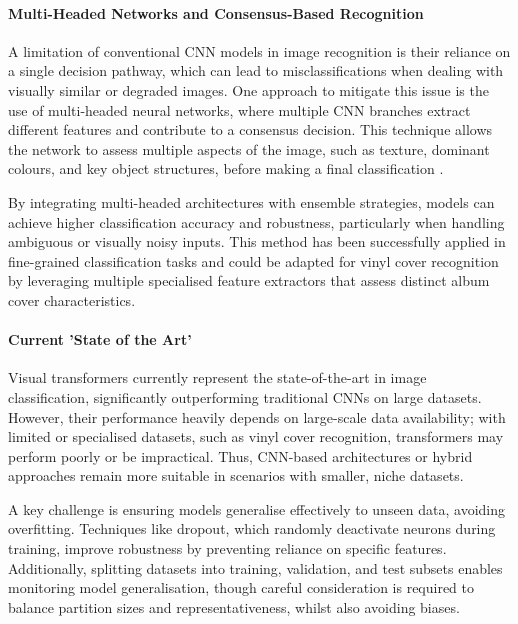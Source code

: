             \paragraph{Multi-Headed Networks and Consensus-Based Recognition}
    
                A limitation of conventional CNN models in image recognition is their reliance on a single decision pathway, which can lead to misclassifications when dealing with visually similar or degraded images. One approach to mitigate this issue is the use of multi-headed neural networks, where multiple CNN branches extract different features and contribute to a consensus decision. This technique allows the network to assess multiple aspects of the image, such as texture, dominant colours, and key object structures, before making a final classification \cite{Zheng2017}. 
            
                By integrating multi-headed architectures with ensemble strategies, models can achieve higher classification accuracy and robustness, particularly when handling ambiguous or visually noisy inputs. This method has been successfully applied in fine-grained classification tasks and could be adapted for vinyl cover recognition by leveraging multiple specialised feature extractors that assess distinct album cover characteristics.
    
            \paragraph{Current 'State of the Art'}
    
                Visual transformers currently represent the state-of-the-art in image classification, significantly outperforming traditional CNNs on large datasets. However, their performance heavily depends on large-scale data availability; with limited or specialised datasets, such as vinyl cover recognition, transformers may perform poorly or be impractical. Thus, CNN-based architectures or hybrid approaches remain more suitable in scenarios with smaller, niche datasets.
    
                A key challenge is ensuring models generalise effectively to unseen data, avoiding overfitting. Techniques like dropout, which randomly deactivate neurons during training, improve robustness by preventing reliance on specific features. Additionally, splitting datasets into training, validation, and test subsets enables monitoring model generalisation, though careful consideration is required to balance partition sizes and representativeness, whilst also avoiding biases.
    
